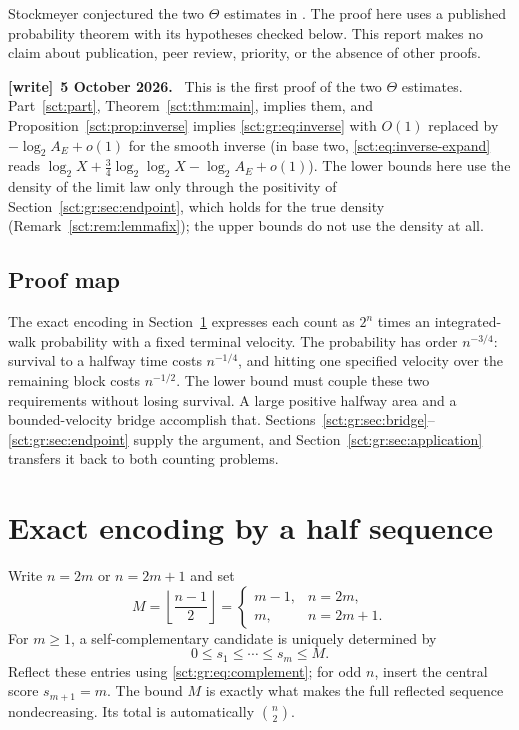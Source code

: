 \documentclass[11pt,letterpaper]{article}
\theoremstyle{definition}\newtheorem{remark}[theorem]{Remark}
\newenvironment{writenote}[1][]{\par\smallskip\begingroup\small
 \noindent\textbf{[write]}\if\relax\detokenize{#1}\relax\else~\textbf{#1.}\fi\ }%
 {\par\endgroup\smallskip}
\begin{document}
Stockmeyer conjectured the two $\Theta$ estimates in
\cite[Section 6, p.~8]{stockmeyer}. The proof here uses a published probability
theorem with its hypotheses checked below. This report makes no claim about
publication, peer review, priority, or the absence of other proofs.
\begin{writenote}[5 October 2026]
This is the first proof of the two $\Theta$ estimates. Part~\ref{sct:part}, Theorem~\ref{sct:thm:main}, implies them, and Proposition~\ref{sct:prop:inverse} implies \eqref{sct:gr:eq:inverse} with $O(1)$ replaced by $-\log_2A_E+o(1)$ for the smooth inverse (in base two, \eqref{sct:eq:inverse-expand} reads $\log_2X+\frac34\log_2\log_2X-\log_2A_E+o(1)$). The lower bounds here use the density of the limit law only through the positivity of Section~\ref{sct:gr:sec:endpoint}, which holds for the true density (Remark~\ref{sct:rem:lemmafix}); the upper bounds do not use the density at all.
\end{writenote}

\subsection{Proof map}

The exact encoding in Section~\ref{sct:gr:sec:encoding} expresses each count as $2^n$
times an integrated-walk probability with a fixed terminal velocity. The
probability has order $n^{-3/4}$: survival to a halfway time costs $n^{-1/4}$,
and hitting one specified velocity over the remaining block costs $n^{-1/2}$.
The lower bound must couple these two requirements without losing survival.
A large positive halfway area and a bounded-velocity bridge accomplish that.
Sections~\ref{sct:gr:sec:bridge}--\ref{sct:gr:sec:endpoint} supply the argument, and
Section~\ref{sct:gr:sec:application} transfers it back to both counting problems.

\section{Exact encoding by a half sequence}\label{sct:gr:sec:encoding}

Write $n=2m$ or $n=2m+1$ and set
\[
 M=\left\lfloor\frac{n-1}{2}\right\rfloor
 =\begin{cases}m-1,&n=2m,\\m,&n=2m+1.\end{cases}
\]
For $m\ge1$, a self-complementary candidate is uniquely determined by
\begin{equation}\label{sct:gr:eq:half}
 0\le s_1\le\cdots\le s_m\le M.
\end{equation}
Reflect these entries using \eqref{sct:gr:eq:complement}; for odd $n$, insert the
central score $s_{m+1}=m$. The bound $M$ is exactly what makes the full reflected
sequence nondecreasing. Its total is automatically $\binom{n}{2}$.
\end{document}
